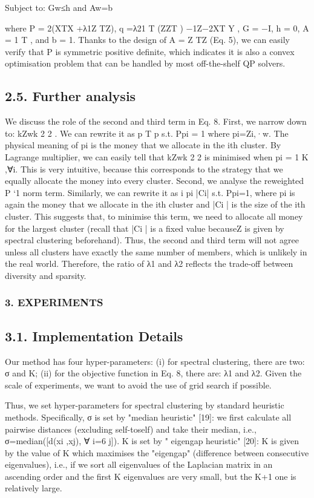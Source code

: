 \documentclass{article}
\begin{document}
Subject to: Gw≤h and Aw=b

where P = 2(XTX +λ1Z TZ), q =λ21 T (ZZT ) −1Z−2XT Y , G = −I, h = 0, A = 1 T , and b = 1. Thanks to the design of A = Z TZ (Eq. 5), we can easily verify that P is symmetric positive definite, which indicates it is also a convex optimisation problem that can be handled by most off-the-shelf QP solvers.

\subsection{2.5. Further analysis}

We discuss the role of the second and third term in Eq. 8. First, we narrow down to: kZwk 2 2 . We can rewrite it as p T p s.t. Ppi = 1 where pi=Zi,·w. The physical meaning of pi is the money that we allocate in the ith cluster. By Lagrange multiplier, we can easily tell that kZwk 2 2 is minimised when pi = 1 K ,∀i. This is very intuitive, because this corresponds to the strategy that we equally allocate the money into every cluster. Second, we analyse the reweighted P `1 norm term. Similarly, we can rewrite it as i pi |Ci| s.t. Ppi=1, where pi is again the money that we allocate in the ith cluster and |Ci | is the size of the ith cluster. This suggests that, to minimise this term, we need to allocate all money for the largest cluster (recall that |Ci | is a fixed value becauseZ is given by spectral clustering beforehand). Thus, the second and third term will not agree unless all clusters have exactly the same number of members, which is unlikely in the real world. Therefore, the ratio of λ1 and λ2 reflects the trade-off between diversity and sparsity.

\subsubsection{3. EXPERIMENTS}

\subsection{3.1. Implementation Details}

Our method has four hyper-parameters: (i) for spectral clustering, there are two: σ and K; (ii) for the objective function in Eq. 8, there are: λ1 and λ2. Given the scale of experiments, we want to avoid the use of grid search if possible.

Thus, we set hyper-parameters for spectral clustering by standard heuristic methods. Specifically, σ is set by "median heuristic" [19]: we first calculate all pairwise distances (excluding self-toself) and take their median, i.e., σ=median([d(xi ,xj), ∀ i=6 j]). K is set by " eigengap heuristic" [20]: K is given by the value of K which maximises the "eigengap" (difference between consecutive eigenvalues), i.e., if we sort all eigenvalues of the Laplacian matrix in an ascending order and the first K eigenvalues are very small, but the K+1 one is relatively large.
\end{document}
